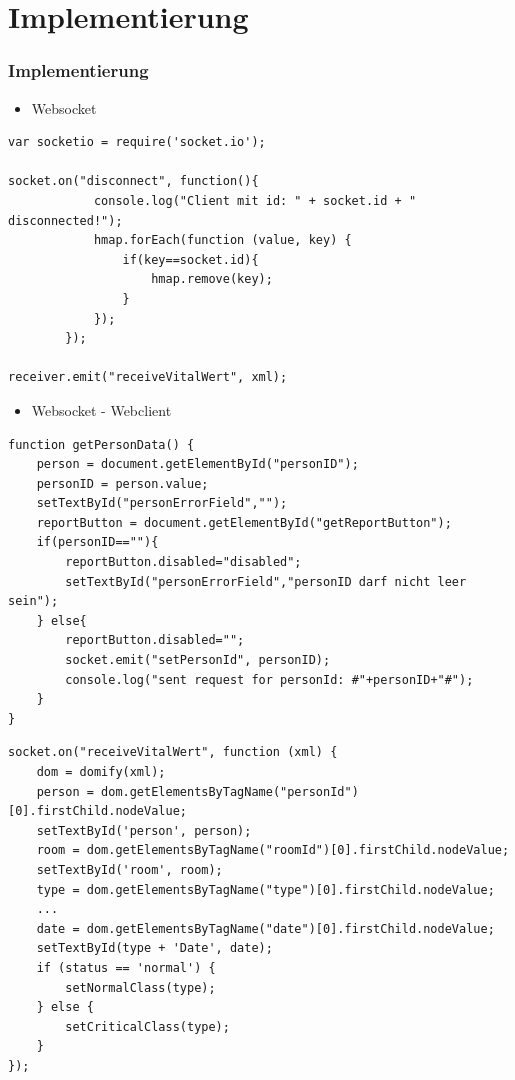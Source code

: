 \documentclass{beamer}
\begin{document}
\section{Implementierung}
\begin{frame}[fragile]
\frametitle{Implementierung}
\begin{itemize}
	\item Websocket
\end{itemize}
\begin{lstlisting}
var socketio = require('socket.io');

socket.on("disconnect", function(){
            console.log("Client mit id: " + socket.id + " disconnected!");
            hmap.forEach(function (value, key) {
                if(key==socket.id){
                    hmap.remove(key);
                }
            });
        });
        
receiver.emit("receiveVitalWert", xml);
\end{lstlisting}
\end{frame}

\begin{frame}[fragile]
\begin{itemize}
	\item Websocket - Webclient
\end{itemize}
\begin{lstlisting}
function getPersonData() {
    person = document.getElementById("personID");
    personID = person.value;
    setTextById("personErrorField","");
    reportButton = document.getElementById("getReportButton");
    if(personID==""){
        reportButton.disabled="disabled";
        setTextById("personErrorField","personID darf nicht leer sein");
    } else{
        reportButton.disabled="";
        socket.emit("setPersonId", personID);
        console.log("sent request for personId: #"+personID+"#");    
    }
}
\end{lstlisting}
\end{frame}

\begin{frame}[fragile]
\begin{lstlisting}
socket.on("receiveVitalWert", function (xml) {
    dom = domify(xml);
    person = dom.getElementsByTagName("personId")[0].firstChild.nodeValue;
    setTextById('person', person);
    room = dom.getElementsByTagName("roomId")[0].firstChild.nodeValue;
    setTextById('room', room);
    type = dom.getElementsByTagName("type")[0].firstChild.nodeValue;
    ...
    date = dom.getElementsByTagName("date")[0].firstChild.nodeValue;
    setTextById(type + 'Date', date);
    if (status == 'normal') {
        setNormalClass(type);
    } else {
        setCriticalClass(type);
    }
});
\end{lstlisting}
\end{frame}
\end{document}
